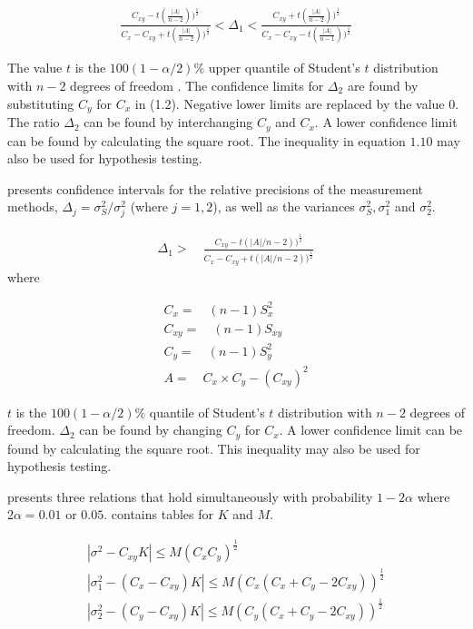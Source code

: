 \documentclass[12pt, a4paper]{report}
\theoremstyle{plain}
\theoremstyle{definition}
\theoremstyle{remark}
\begin{document}
	\begin{eqnarray}
	\frac{C_{xy}-
		t(\frac{|A|}{n-2}))^{\frac{1}{2}}}{C_{x}-C_{xy}+
		t(\frac{|A|}{n-2}))^{\frac{1}{2}}} <
	\Delta_{1} < \frac{C_{xy}+
		t(\frac{|A|}{n-2}))^{\frac{1}{2}}}{C_{x}-C_{xy}-
		t(\frac{|A|}{n-1}))^{\frac{1}{2}}} \nonumber
	\end{eqnarray}
	
	
	The value $t$ is the $100(1-\alpha/2)\%$ upper quantile of
	Student's $t$ distribution with $n-2$ degrees of freedom
	\citep{kinsella}. The confidence limits for $\Delta_{2}$ are found by substituting $C_{y}$ for $C_{x}$ in (1.2).
	Negative lower limits are replaced by the value $0$.
	The ratio $\Delta_{2}$
	can be found by interchanging $C_{y}$ and $C_{x}$. A lower
	confidence limit can be found by calculating the square root. The
	inequality in equation $1.10$ may also be used for hypothesis
	testing.
	
	
	
	\citet{Thompson} presents confidence intervals for the relative
	precisions of the measurement methods, $\Delta_{j}=
	\sigma^2_{S}/\sigma^2_{j}$ (where $j=1,2$), as well as the
	variances $\sigma^{2}_{S}, \sigma^{2}_{1}$ and $\sigma^{2}_{2}$.
	
	\begin{eqnarray}
	\Delta_{1} >\quad \frac{C_{xy}-
		t(|A|/n-2))^{\frac{1}{2}}}{C_{x}-C_{xy}+
		t(|A|/n-2))^{\frac{1}{2}}}
	\end{eqnarray}
	where
	
	\begin{eqnarray}
	C_{x}=\quad(n-1)S^2_{x}\nonumber\\
	C_{xy}=\quad(n-1)S_{xy}\nonumber\\
	C_{y}=\quad(n-1)S^2_{y}\nonumber\\
	A=\quad C_{x}\times C_{y} - (C_{xy})^2 \nonumber
	\end{eqnarray}
	
	$t$ is the $100(1-\alpha/2)\%$ quantile of Student's $t$
	distribution with $n-2$ degrees of freedom. $\Delta_{2}$ can be
	found by changing $C_{y}$ for $C_{x}$. A lower confidence limit
	can be found by calculating the square root. This inequality may
	also be used for hypothesis testing.
	
	\citet{Thompson} presents three relations that hold simultaneously
	with probability $1-2\alpha$ where $2\alpha=0.01$ or $0.05$. \citet{Thompson} contains tables for $K$ and $M$.
	
	\begin{eqnarray}
	|\sigma^2-C_{xy}K|\leqslant M(C_{x}C_{y})^{\frac{1}{2}}\\
	|\sigma^2_{1}-(C_{x}-C_{xy})K|\leqslant M(C_{x}(C_{x}+C_{y}-2C_{xy}))^{\frac{1}{2}}\nonumber\\
	|\sigma^2_{2}-(C_{y}-C_{xy})K|\leqslant
	M(C_{y}(C_{x}+C_{y}-2C_{xy}))^{\frac{1}{2}}\nonumber
	\end{eqnarray}	
	
\end{document}

